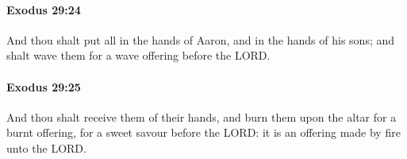 		\paragraph{Exodus 29:24} %
			\label{EXODUS-29-24}

			And thou shalt put all in the hands of Aaron, and in the hands of his sons; and shalt wave them for a wave offering before the LORD.


		\paragraph{Exodus 29:25} %
			\label{EXODUS-29-25}

			And thou shalt receive them of their hands, and burn them upon the altar for a burnt offering, for a sweet savour before the LORD: it is an offering made by fire unto the LORD.


